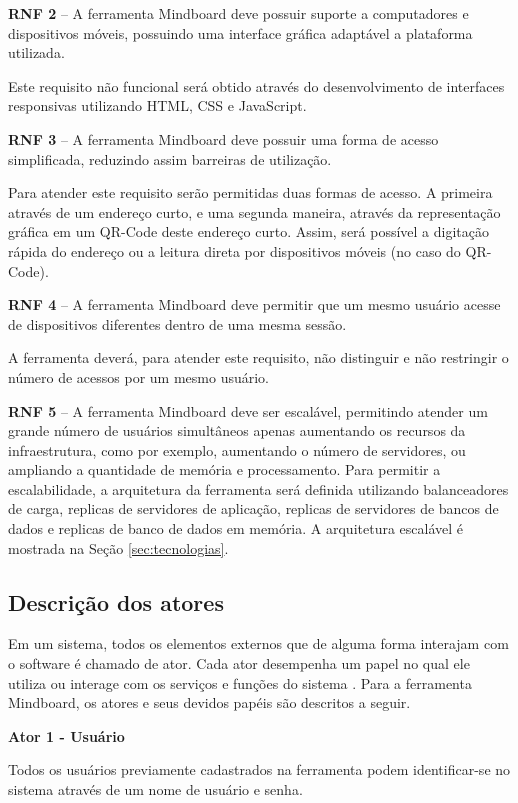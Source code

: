\textbf{RNF 2} – A ferramenta Mindboard deve possuir suporte a computadores e dispositivos móveis, possuindo uma interface gráfica adaptável a plataforma utilizada.

Este requisito não funcional será obtido através do desenvolvimento de interfaces responsivas utilizando HTML, CSS e JavaScript.

\textbf{RNF 3} – A ferramenta Mindboard deve possuir uma forma de acesso simplificada, reduzindo assim barreiras de utilização. 

Para atender este requisito serão permitidas duas formas de acesso. A primeira através de um endereço curto, e uma segunda maneira, através da representação gráfica em um QR-Code deste endereço curto. Assim, será possível a digitação rápida do endereço ou a leitura direta por dispositivos móveis (no caso do QR-Code).

\textbf{RNF 4} – A ferramenta Mindboard deve permitir que um mesmo usuário acesse de dispositivos diferentes dentro de uma mesma sessão. 

A ferramenta deverá, para atender este requisito, não distinguir e não restringir o número de acessos por um mesmo usuário.

\textbf{RNF 5} – A ferramenta Mindboard deve ser escalável, permitindo atender um grande número de usuários simultâneos apenas aumentando os recursos da infraestrutura, como por exemplo, aumentando o número de servidores, ou ampliando a quantidade de memória e processamento.  Para permitir a escalabilidade, a arquitetura da ferramenta será definida utilizando balanceadores de carga, replicas de servidores de aplicação, replicas de servidores de bancos de dados e replicas de banco de dados em memória. A arquitetura escalável é mostrada na Seção \ref{sec:tecnologias}.


\subsection{Descrição dos atores}


Em um sistema, todos os elementos externos que de alguma forma interajam com o software é chamado de ator. Cada ator desempenha um papel no qual ele utiliza ou interage com os serviços e funções do sistema \cite{guedes:2009}. Para a ferramenta Mindboard, os atores e seus devidos papéis são descritos a seguir.


\textbf{Ator 1 - Usuário}

Todos os usuários previamente cadastrados na ferramenta podem identificar-se no sistema através de um nome de usuário e senha.

